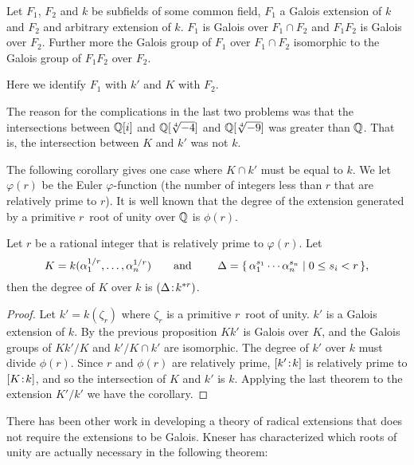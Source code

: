 \begin{proposition}
Let $F_1$, $F_2$ and $k$ be subfields of some common field, $F_1$ a Galois
extension of $k$ and $F_2$ and arbitrary extension of $k$.  $F_1$ is Galois
over $F_1 \cap F_2$ and $F_1 F_2$ is Galois over $F_2$.  Further more the
Galois group of $F_1$ over $F_1 \cap F_2$ isomorphic to the Galois group of
$F_1 F_2$ over $F_2$.
\end{proposition}

Here we identify $F_1$ with $k'$ and $K$ with $F_2$.

The reason for the complications in the last two problems was that the
intersections between $\mathbb{Q}[i]$ and $\Q[\root4\of{-4}]$ and
$\Q[\root4\of{-9}]$ was greater than $\mathbb{Q}$.  That is, the
intersection between $K$ and $k'$ was not $k$.

The following corollary gives one case where $K \cap k'$ must be equal
to $k$.  We let $\varphi(r)$ be the Euler $\varphi$-function (the number
of integers less than $r$ that are relatively prime to $r$).  It is
well known that the degree of the extension generated by a primitive
$r$\th\ root of unity over $\mathbb{Q}$ is $\phi(r)$.

\begin{corollary} Let $r$ be a rational integer that is relatively
prime to $\varphi(r)$.  Let
\[
K = k(\alpha_1^{1/r}, \ldots, \alpha_n^{1/r})
\qquad\hbox{and }\qquad
\Delta = \{\,\alpha_1^{s_1} \cdots \alpha_n^{s_n} \mid 0 \le s_i < r\,\},
\]
then the degree of $K$ over $k$ is $(\Delta\!:\!k^{\ast r})$.
\end{corollary}

\begin{proof}
Let $k' = k(\zeta_r)$ where $\zeta_r$ is a primitive $r$\th\ root of unity.
$k'$ is a Galois extension of $k$.  By the previous proposition $Kk'$ is
Galois over $K$, and the Galois groups of $Kk'/K$ and $k'/K\cap k'$ are
isomorphic.  The degree of $k'$ over $k$ must divide $\phi(r)$.  Since $r$
and $\phi(r)$ are relatively prime, $[k'\!:\!k]$ is relatively
prime to $[K\!:\!k]$, and so the intersection of $K$ and $k'$ is
$k$.  Applying the last theorem to the extension $K'/ k'$ we have the
corollary.
\end{proof}

There has been other work in developing a theory of radical extensions that
does not require the extensions to be Galois.  Kneser
\cite{Kneser_undated-fd} has characterized which roots of unity are actually
necessary in the following theorem:

